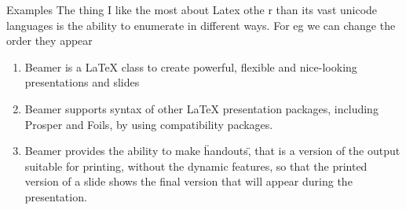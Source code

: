 \documentclass{beamer}
\begin{document}
\fboxsep=0pt
\noindent{}%
\hfill
{}
\begin{frame}{Examples}
The thing I like the most about Latex othe r than its vast unicode languages is the  ability to enumerate in different ways. For eg we can change the order they appear 
\begin{enumerate}
\item<1-> Beamer is a LaTeX class to create powerful, flexible and nice-looking presentations and slides\\
\item<3-> Beamer supports syntax of other LaTeX presentation packages, including Prosper and Foils, by using compatibility packages.\\
\item<2-> Beamer provides the ability to make \"handouts\", that is a version of the output suitable for printing, without the dynamic features, so that the printed version of a slide shows the final version that will appear during the presentation. \\
\end{enumerate}
\end{frame}
\end{document}
